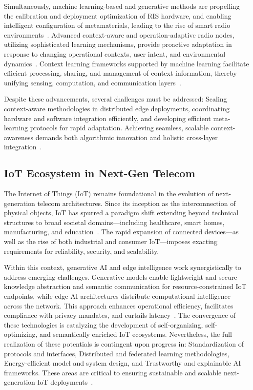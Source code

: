 \documentclass[sigconf]{acmart}
\begin{document}
Simultaneously, machine learning-based and generative methods are propelling the calibration and deployment optimization of RIS hardware, and enabling intelligent configuration of metamaterials, leading to the rise of smart radio environments~\cite{ref27,ref39}. Advanced context-aware and operation-adaptive radio nodes, utilizing sophisticated learning mechanisms, provide proactive adaptation in response to changing operational contexts, user intent, and environmental dynamics~\cite{ref28}. Context learning frameworks supported by machine learning facilitate efficient processing, sharing, and management of context information, thereby unifying sensing, computation, and communication layers~\cite{ref28,ref30}.

Despite these advancements, several challenges must be addressed:
Scaling context-aware methodologies in distributed edge deployments,
coordinating hardware and software integration efficiently,
and developing efficient meta-learning protocols for rapid adaptation.
Achieving seamless, scalable context-awareness demands both algorithmic innovation and holistic cross-layer integration~\cite{ref27,ref28,ref39}.

\subsection{IoT Ecosystem in Next-Gen Telecom}

The Internet of Things (IoT) remains foundational in the evolution of next-generation telecom architectures. Since its inception as the interconnection of physical objects, IoT has spurred a paradigm shift extending beyond technical structures to broad societal domains—including healthcare, smart homes, manufacturing, and education~\cite{ref45}. The rapid expansion of connected devices—as well as the rise of both industrial and consumer IoT—imposes exacting requirements for reliability, security, and scalability.

Within this context, generative AI and edge intelligence work synergistically to address emerging challenges. Generative models enable lightweight and secure knowledge abstraction and semantic communication for resource-constrained IoT endpoints, while edge AI architectures distribute computational intelligence across the network. This approach enhances operational efficiency, facilitates compliance with privacy mandates, and curtails latency~\cite{ref44,ref45,ref49}. The convergence of these technologies is catalyzing the development of self-organizing, self-optimizing, and semantically enriched IoT ecosystems. Nevertheless, the full realization of these potentials is contingent upon progress in:
Standardization of protocols and interfaces,
Distributed and federated learning methodologies,
Energy-efficient model and system design, and
Trustworthy and explainable AI frameworks.
These areas are critical to ensuring sustainable and scalable next-generation IoT deployments~\cite{ref44,ref45}.
\end{document}
